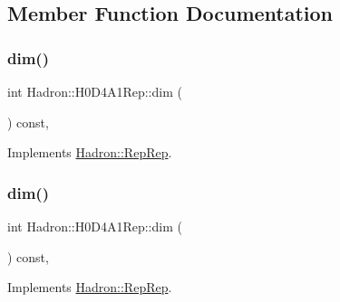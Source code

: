 \subsection{Member Function Documentation}
\mbox{\label{structHadron_1_1H0D4A1Rep_ac5a45aa7f7cdc3ab70b8c164b2e1dce0}} 
\subsubsection{\texorpdfstring{dim()}{dim()}\hspace{0.1cm}{\footnotesize\ttfamily [1/5]}}
{\footnotesize\ttfamily int Hadron\+::\+H0\+D4\+A1\+Rep\+::dim (\begin{DoxyParamCaption}{ }\end{DoxyParamCaption}) const\hspace{0.3cm}{\ttfamily [inline]}, {\ttfamily [virtual]}}



Implements \mbox{\hyperlink{structHadron_1_1RepRep_a92c8802e5ed7afd7da43ccfd5b7cd92b}{Hadron\+::\+Rep\+Rep}}.

\mbox{\label{structHadron_1_1H0D4A1Rep_ac5a45aa7f7cdc3ab70b8c164b2e1dce0}} 
\subsubsection{\texorpdfstring{dim()}{dim()}\hspace{0.1cm}{\footnotesize\ttfamily [2/5]}}
{\footnotesize\ttfamily int Hadron\+::\+H0\+D4\+A1\+Rep\+::dim (\begin{DoxyParamCaption}{ }\end{DoxyParamCaption}) const\hspace{0.3cm}{\ttfamily [inline]}, {\ttfamily [virtual]}}



Implements \mbox{\hyperlink{structHadron_1_1RepRep_a92c8802e5ed7afd7da43ccfd5b7cd92b}{Hadron\+::\+Rep\+Rep}}.

\mbox{\label{structHadron_1_1H0D4A1Rep_ac5a45aa7f7cdc3ab70b8c164b2e1dce0}} 
